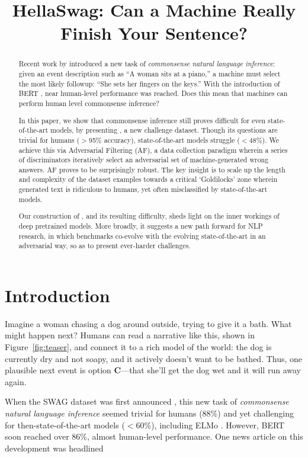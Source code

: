\title{{HellaSwag}: Can a Machine Really Finish Your Sentence?}

\begin{abstract}
Recent work by \citet{zellers2018swagaf} introduced a new task of \emph{commonsense natural language inference}: given an event description such as ``A woman sits at a piano,'' a machine must select the most likely followup: ``She sets her fingers on the keys.'' With the introduction of BERT \cite{devlin2018bert}, near human-level performance was reached. Does this mean that machines can perform human level commonsense inference?

In this paper, we show that commonsense inference still proves difficult for even state-of-the-art models, by presenting {}, a new challenge dataset. Though its questions are trivial for humans (${>}$95\% accuracy), state-of-the-art models struggle (${<}$48\%). We achieve this via Adversarial Filtering (AF), a data collection paradigm wherein a series of discriminators iteratively select an adversarial set of machine-generated wrong answers. AF proves to be surprisingly robust. The key insight is to scale up the length and complexity of the dataset examples towards a critical `Goldilocks' zone wherein generated text is ridiculous to humans, yet often misclassified by state-of-the-art models.

Our construction of {}, and its resulting difficulty, sheds light on the inner workings of deep pretrained models. More broadly, it suggests a new path forward for NLP research, in which benchmarks co-evolve with the evolving state-of-the-art in an adversarial way, so as to present ever-harder challenges.
\end{abstract}

\section{Introduction}

Imagine a woman chasing a dog around outside, trying to give it a bath. What might happen next? Humans can read a narrative like this, shown in Figure~\ref{fig:teaser}, and connect it to a rich model of the world: the dog is currently dry and not soapy, and it actively doesn't want to be bathed. Thus, one plausible next event is option \textbf{C}---that she'll get the dog wet and it will run away again. 

When the SWAG dataset was first announced \cite{zellers2018swagaf}, this new task of \emph{commonsense natural language inference} seemed trivial for humans (88\%) and yet challenging for then-state-of-the-art models (${<}$60\%), including ELMo \cite{peters2018deep}. However, BERT \cite{devlin2018bert} soon reached over 86\%, almost human-level performance. One news article on this development was headlined 

